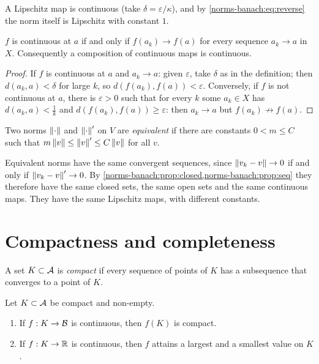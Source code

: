 \begin{notechapter}
A Lipschitz map is continuous (take $\delta = \varepsilon/\kappa$), and by
\eqref{norms-banach:eq:reverse} the norm itself is Lipschitz with
constant $1$.

\begin{proposition}\label{norms-banach:prop:seq}
$f$ is continuous at $a$ if and only if $f(a_k)\to f(a)$ for every sequence
$a_k\to a$ in $X$. Consequently a composition of continuous maps is
continuous.
\end{proposition}

\begin{proof}
If $f$ is continuous at $a$ and $a_k\to a$: given $\varepsilon$, take
$\delta$ as in the definition; then $d(a_k, a) < \delta$ for large $k$, so
$d(f(a_k), f(a)) < \varepsilon$. Conversely, if $f$ is not continuous at
$a$, there is $\varepsilon > 0$ such that for every $k$ some $a_k\in X$ has
$d(a_k, a) < \frac1k$ and $d(f(a_k), f(a))\geq\varepsilon$: then
$a_k\to a$ but $f(a_k)\not\to f(a)$.
\end{proof}

\begin{definition}
Two norms $\left\|\cdot\right\|$ and $\left\|\cdot\right\|'$ on $V$ are \emph{equivalent} if
there are constants $0 < m\leq C$ such that
$m\left\|v\right\|\leq\left\|v\right\|'\leq C\left\|v\right\|$ for all $v$.
\end{definition}

Equivalent norms have the same convergent sequences, since
$\left\|v_k - v\right\|\to0$ if and only if $\left\|v_k - v\right\|'\to0$. By
\cref{norms-banach:prop:closed,norms-banach:prop:seq} they therefore have
the same closed sets, the same open sets and the same continuous maps.
They have the same Lipschitz maps, with different constants.

\section{Compactness and completeness}\label{norms-banach:sec:compact}

\begin{definition}
A set $K\subset\mathcal{A}$ is \emph{compact} if every sequence of points of $K$
has a subsequence that converges to a point of $K$.
\end{definition}

\begin{theorem}
\label{norms-banach:thm:extreme}
Let $K\subset\mathcal{A}$ be compact and non-empty.
\begin{enumerate}[nosep]
  \item If $f:K\to\mathcal{B}$ is continuous, then $f(K)$ is compact.
  \item If $f:K\to\mathbb{R}$ is continuous, then $f$ attains a largest and a
        smallest value on $K$.
\end{enumerate}
\end{theorem}


\end{notechapter}

